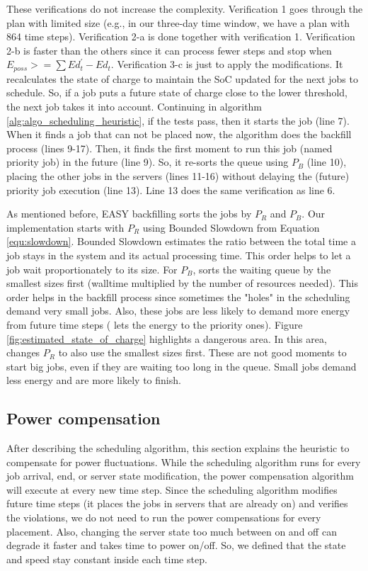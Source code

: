 These verifications do not increase the complexity. Verification 1 goes through the plan with limited size (e.g., in our three-day time window, we have a plan with 864 time steps). Verification 2-a is done together with verification 1. Verification 2-b is faster than the others since it can process fewer steps and stop when $E_{poss} >= \sum Ed_t^{'} - Ed_t$. Verification 3-c is just to apply the modifications. It recalculates the state of charge to maintain the SoC updated for the next jobs to schedule. So, if a job puts a future state of charge close to the lower threshold, the next job takes it into account. Continuing in algorithm \ref{alg:algo_scheduling_heuristic}, if the tests pass, then it starts the job (line 7). When it finds a job that can not be placed now, the algorithm does the backfill process (lines 9-17). Then, it finds the first moment to run this job (named priority job) in the future (line 9). So, it re-sorts the queue using $P_{B}$ (line 10), placing the other jobs in the servers (lines 11-16) without delaying the (future) priority job execution (line 13). Line 13 does the same verification as line 6.

As mentioned before, EASY backfilling sorts the jobs by $P_{R}$ and $P_{B}$. Our implementation starts with $P_{R}$ using Bounded Slowdown from Equation \ref{equ:slowdown}. Bounded Slowdown estimates the ratio between the total time a job stays in the system and its actual processing time. This order helps to let a job wait proportionately to its size. For $P_{B}$, \emph{\systemName} sorts the waiting queue by the smallest sizes first (walltime multiplied by the number of resources needed). This order helps in the backfill process since sometimes the "holes" in the scheduling demand very small jobs. Also, these jobs are less likely to demand more energy from future time steps (\emph{\systemName} lets the energy to the priority ones). Figure \ref{fig:estimated_state_of_charge} highlights a dangerous area. In this area, \emph{\systemName} changes $P_{R}$ to also use the smallest sizes first. These are not good moments to start big jobs, even if they are waiting too long in the queue. Small jobs demand less energy and are more likely to finish.

\subsection{Power compensation}
\label{sec:model_compensations}

After describing the scheduling algorithm, this section explains the heuristic to compensate for power fluctuations. While the scheduling algorithm runs for every job arrival, end, or server state modification, the power compensation algorithm will execute at every new time step. Since the scheduling algorithm modifies future time steps (it places the jobs in servers that are already on) and verifies the violations, we do not need to run the power compensations for every placement. Also, changing the server state too much between on and off can degrade it faster and takes time to power on/off. So, we defined that the state and speed stay constant inside each time step. 

